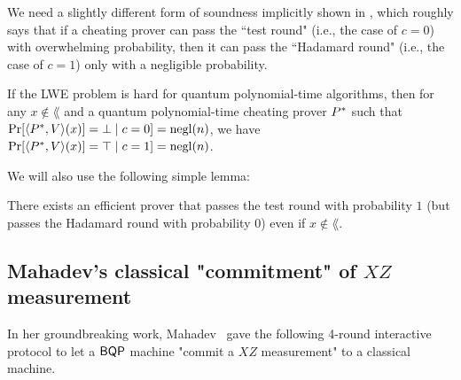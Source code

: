 We need a slightly different form of soundness implicitly shown in \cite{FOCS:Mahadev18a}, which roughly says that if a cheating prover can pass the ``test round" (i.e., the case of $c=0$) with overwhelming probability, then it can pass the ``Hadamard round" (i.e., the case of $c=1$) only with a negligible probability. 
\begin{lemma}\label{lem:Mah_soundness}
If the LWE problem is hard for quantum polynomial-time algorithms, then for any $x\notin \lang$ and a quantum polynomial-time cheating prover $P^*$ such that  $\Pr[\langle P^*,V \rangle(x)]=\bot\mid c=0]=\operatorname{negl}(n)$, we have $\Pr[\langle P^*,V \rangle(x)]=\top\mid c=1]=\operatorname{negl}(n)$.
\end{lemma}

We will also use the following simple lemma:
\begin{lemma}\label{fact:perfectly_pass_test}
There exists an efficient prover that passes the test round with probability $1$ (but passes the Hadamard round with probability $0$) even if $x\notin \lang$. 
\end{lemma}


\subsection{Mahadev's classical "commitment" of $XZ$ measurement}

In her groundbreaking work, Mahadev~\cite{FOCS:Mahadev18a} gave the following 4-round interactive protocol to let a $\operatorname{\mathsf{BQP}}$ machine "commit a $XZ$ measurement" to a classical machine. 

